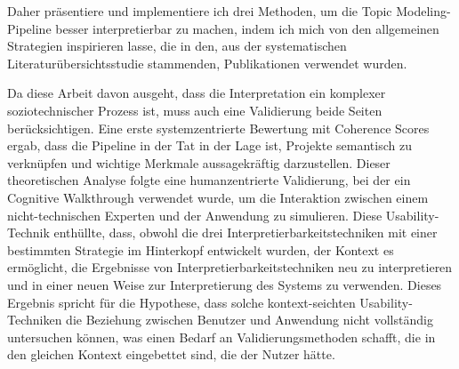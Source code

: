 Daher präsentiere und implementiere ich drei Methoden, um die Topic Modeling-Pipeline besser interpretierbar zu machen, indem ich mich von den allgemeinen Strategien inspirieren lasse, die in den, aus der systematischen Literaturübersichtsstudie stammenden, Publikationen verwendet wurden.

Da diese Arbeit davon ausgeht, dass die Interpretation ein komplexer soziotechnischer Prozess ist, muss auch eine Validierung beide Seiten berücksichtigen. Eine erste systemzentrierte Bewertung mit Coherence Scores ergab, dass die Pipeline in der Tat in der Lage ist, Projekte semantisch zu verknüpfen und wichtige Merkmale aussagekräftig darzustellen. Dieser theoretischen Analyse folgte eine humanzentrierte Validierung, bei der ein Cognitive Walkthrough verwendet wurde, um die Interaktion zwischen einem nicht-technischen Experten und der Anwendung zu simulieren. Diese Usability-Technik enthüllte, dass, obwohl die drei Interpretierbarkeitstechniken mit einer bestimmten Strategie im Hinterkopf entwickelt wurden, der Kontext es ermöglicht, die Ergebnisse von Interpretierbarkeitstechniken neu zu interpretieren und in einer neuen Weise zur Interpretierung des Systems zu verwenden. Dieses Ergebnis spricht für die Hypothese, dass solche kontext-seichten Usability-Techniken die Beziehung zwischen Benutzer und Anwendung nicht vollständig untersuchen können, was einen Bedarf an Validierungsmethoden schafft, die in den gleichen Kontext eingebettet sind, die der Nutzer hätte.

\cleardoublepage